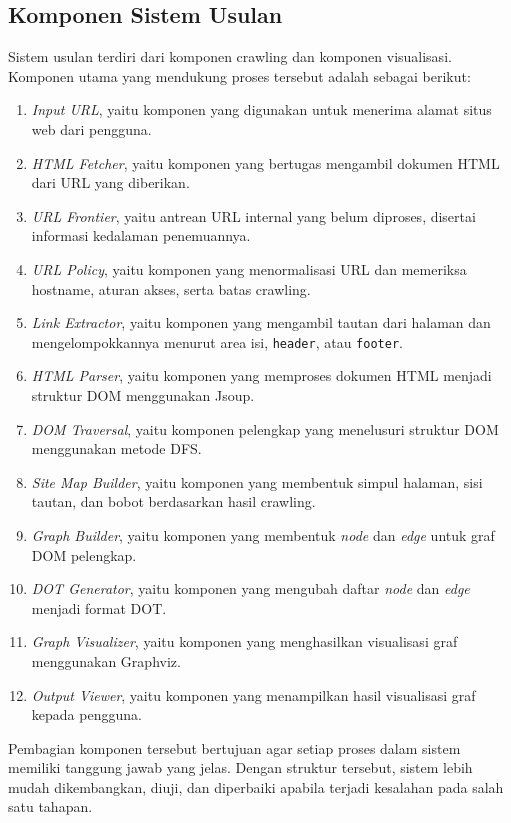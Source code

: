 \subsection{Komponen Sistem Usulan}
Sistem usulan terdiri dari komponen crawling dan komponen visualisasi. Komponen utama yang mendukung proses tersebut adalah sebagai berikut:

\begin{enumerate}
    \item \textit{Input URL}, yaitu komponen yang digunakan untuk menerima alamat situs web dari pengguna.
    \item \textit{HTML Fetcher}, yaitu komponen yang bertugas mengambil dokumen HTML dari URL yang diberikan.
    \item \textit{URL Frontier}, yaitu antrean URL internal yang belum diproses, disertai informasi kedalaman penemuannya.
    \item \textit{URL Policy}, yaitu komponen yang menormalisasi URL dan memeriksa hostname, aturan akses, serta batas crawling.
    \item \textit{Link Extractor}, yaitu komponen yang mengambil tautan dari halaman dan mengelompokkannya menurut area isi, \texttt{header}, atau \texttt{footer}.
    \item \textit{HTML Parser}, yaitu komponen yang memproses dokumen HTML menjadi struktur DOM menggunakan Jsoup.
    \item \textit{DOM Traversal}, yaitu komponen pelengkap yang menelusuri struktur DOM menggunakan metode DFS.
    \item \textit{Site Map Builder}, yaitu komponen yang membentuk simpul halaman, sisi tautan, dan bobot berdasarkan hasil crawling.
    \item \textit{Graph Builder}, yaitu komponen yang membentuk \textit{node} dan \textit{edge} untuk graf DOM pelengkap.
    \item \textit{DOT Generator}, yaitu komponen yang mengubah daftar \textit{node} dan \textit{edge} menjadi format DOT.
    \item \textit{Graph Visualizer}, yaitu komponen yang menghasilkan visualisasi graf menggunakan Graphviz.
    \item \textit{Output Viewer}, yaitu komponen yang menampilkan hasil visualisasi graf kepada pengguna.
\end{enumerate}

Pembagian komponen tersebut bertujuan agar setiap proses dalam sistem memiliki tanggung jawab yang jelas. Dengan struktur tersebut, sistem lebih mudah dikembangkan, diuji, dan diperbaiki apabila terjadi kesalahan pada salah satu tahapan.

